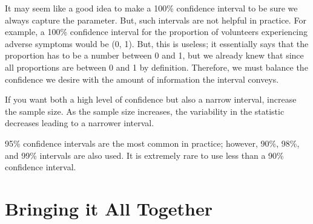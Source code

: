 \documentclass[
  letterpaper,
  DIV=11,
  numbers=noendperiod]{scrreprt}
\theoremstyle{definition}
\theoremstyle{definition}
\theoremstyle{plain}
\theoremstyle{remark}
\begin{document}
It may seem like a good idea to make a 100\% confidence interval to be
sure we always capture the parameter. But, such intervals are not
helpful in practice. For example, a 100\% confidence interval for the
proportion of volunteers experiencing adverse symptoms would be (0, 1).
But, this is useless; it essentially says that the proportion has to be
a number between 0 and 1, but we already knew that since all proportions
are between 0 and 1 by definition. Therefore, we must balance the
confidence we desire with the amount of information the interval
conveys.

\begin{tcolorbox}[enhanced jigsaw, colbacktitle=quarto-callout-tip-color!10!white, colback=white, left=2mm, title=\textcolor{quarto-callout-tip-color}{\faLightbulb}\hspace{0.5em}{Big Idea}, toptitle=1mm, leftrule=.75mm, breakable, bottomrule=.15mm, arc=.35mm, rightrule=.15mm, toprule=.15mm, coltitle=black, opacityback=0, colframe=quarto-callout-tip-color-frame, opacitybacktitle=0.6, bottomtitle=1mm, titlerule=0mm]

If you want both a high level of confidence but also a narrow interval,
increase the sample size. As the sample size increases, the variability
in the statistic decreases leading to a narrower interval.

\end{tcolorbox}

\begin{tcolorbox}[enhanced jigsaw, colbacktitle=quarto-callout-note-color!10!white, colback=white, left=2mm, title=\textcolor{quarto-callout-note-color}{\faInfo}\hspace{0.5em}{Note}, toptitle=1mm, leftrule=.75mm, breakable, bottomrule=.15mm, arc=.35mm, rightrule=.15mm, toprule=.15mm, coltitle=black, opacityback=0, colframe=quarto-callout-note-color-frame, opacitybacktitle=0.6, bottomtitle=1mm, titlerule=0mm]

95\% confidence intervals are the most common in practice; however,
90\%, 98\%, and 99\% intervals are also used. It is extremely rare to
use less than a 90\% confidence interval.

\end{tcolorbox}

\section{Bringing it All Together}\label{bringing-it-all-together}
\end{document}
